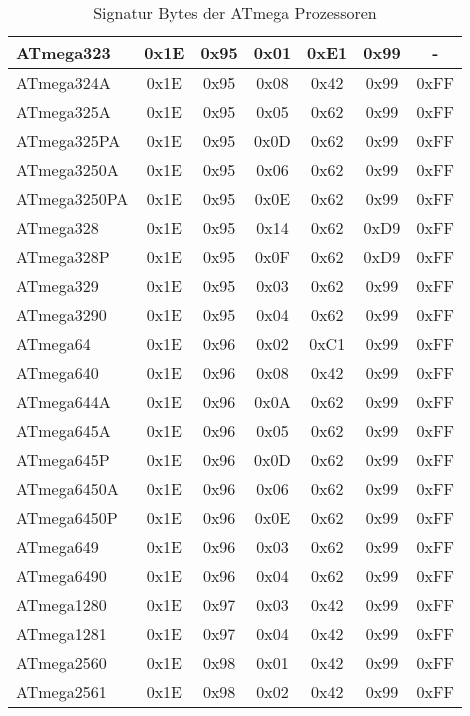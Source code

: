 \begin{table}[H]
\begin{center}
\begin{tabular}{| l | c | c | c || c | c | c |}
    \hline
ATmega323  & 0x1E & 0x95  & 0x01 & 0xE1 & 0x99 &  -  \\
    \hline
ATmega324A & 0x1E & 0x95  & 0x08 & 0x42 & 0x99 & 0xFF \\
    \hline
ATmega325A & 0x1E & 0x95  & 0x05 & 0x62 & 0x99 & 0xFF \\
    \hline
ATmega325PA & 0x1E & 0x95  & 0x0D & 0x62 & 0x99 & 0xFF \\
    \hline
ATmega3250A & 0x1E & 0x95  & 0x06 & 0x62 & 0x99 & 0xFF \\
    \hline
ATmega3250PA & 0x1E & 0x95  & 0x0E & 0x62 & 0x99 & 0xFF \\
    \hline
ATmega328  & 0x1E & 0x95  & 0x14 & 0x62 & 0xD9 & 0xFF \\
    \hline
ATmega328P & 0x1E & 0x95  & 0x0F & 0x62 & 0xD9 & 0xFF \\
    \hline
ATmega329  & 0x1E & 0x95  & 0x03 & 0x62 & 0x99 & 0xFF \\
    \hline
ATmega3290 & 0x1E & 0x95  & 0x04 & 0x62 & 0x99 & 0xFF \\
    \hline
ATmega64   & 0x1E & 0x96  & 0x02 & 0xC1 & 0x99 & 0xFF \\
    \hline
ATmega640  & 0x1E & 0x96  & 0x08 & 0x42 & 0x99 & 0xFF \\
    \hline
ATmega644A & 0x1E & 0x96  & 0x0A & 0x62 & 0x99 & 0xFF \\
    \hline
ATmega645A & 0x1E & 0x96  & 0x05 & 0x62 & 0x99 & 0xFF \\
    \hline
ATmega645P & 0x1E & 0x96  & 0x0D & 0x62 & 0x99 & 0xFF \\
    \hline
ATmega6450A & 0x1E & 0x96  & 0x06 & 0x62 & 0x99 & 0xFF \\
    \hline
ATmega6450P & 0x1E & 0x96  & 0x0E & 0x62 & 0x99 & 0xFF \\
    \hline
ATmega649  & 0x1E & 0x96  & 0x03 & 0x62 & 0x99 & 0xFF \\
    \hline
ATmega6490 & 0x1E & 0x96  & 0x04 & 0x62 & 0x99 & 0xFF \\
    \hline
ATmega1280 & 0x1E & 0x97  & 0x03 & 0x42 & 0x99 & 0xFF \\
    \hline
ATmega1281 & 0x1E & 0x97  & 0x04 & 0x42 & 0x99 & 0xFF \\
    \hline
ATmega2560 & 0x1E & 0x98  & 0x01 & 0x42 & 0x99 & 0xFF \\
    \hline
ATmega2561 & 0x1E & 0x98  & 0x02 & 0x42 & 0x99 & 0xFF \\
    \hline
    \end{tabular}
  \end{center}
  \caption{Signatur Bytes der ATmega Prozessoren}
  \label{tab:megaSignature}
\end{table}


